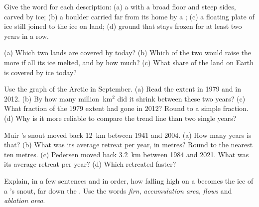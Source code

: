 \begin{exercise}[$\star$]\label{exo:g8:ice-on-earth:3}
Give the word for each description: (a) a  with a broad floor and
steep sides, carved by ice; (b) a boulder carried far from its home by a
; (c) a floating plate of ice still joined to the ice on land;
(d) ground that stays frozen for at least two years in a row.
\end{exercise}

\begin{exercise}[$\star$]\label{exo:g8:ice-on-earth:4}
(a) Which two lands are covered by  today? (b) Which of the two
would raise the  more if all its ice melted, and by how much? (c) What
share of the land on Earth is covered by ice today?
\end{exercise}

\begin{exercise}[$\star\star$]\label{exo:g8:ice-on-earth:5}
Use the graph of the Arctic  in September. (a) Read the extent in
1979 and in 2012. (b) By how many million~km$^2$ did it shrink between
these two years? (c) What fraction of the 1979 extent had gone in 2012?
Round to a simple fraction. (d) Why is it more reliable to compare the
trend line than two single years?
\end{exercise}

\begin{exercise}[$\star\star$]\label{exo:g8:ice-on-earth:6}
Muir 's snout moved back \qty{12}{km} between 1941 and 2004.
(a) How many years is that? (b) What was its average retreat per year, in
metres? Round to the nearest ten metres. (c) Pedersen  moved back
\qty{3.2}{km} between 1984 and 2021. What was its average retreat per
year? (d) Which  retreated faster?
\end{exercise}

\begin{exercise}[$\star\star$]\label{exo:g8:ice-on-earth:7}
Explain, in a few sentences and in order, how  falling high on a
 becomes the ice of a 's snout, far down the . Use
the words \emph{firn}, \emph{accumulation area}, \emph{flows} and
\emph{ablation area}.
\end{exercise}

